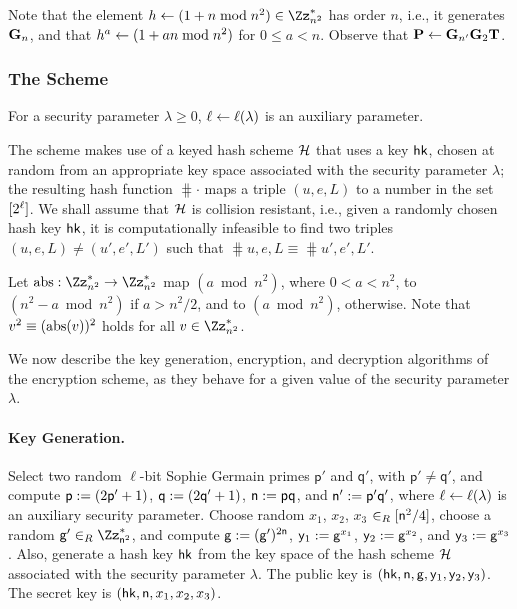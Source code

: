 Note that the element $h \asn (1 + n \bmod n^2) \in \Z{n^2}^*$ has 
order $n$, 
i.e.,
it generates $\mathbf{G}_n$,
and that $h^a \gets (1 + a n \bmod n^2)$ for $0 \le a < n$.
Observe that $\mathbf{P} \gets \mathbf{G}_{n'} \mathbf{G}_2 \mathbf{T}$.

\subsubsection{The Scheme}
For a security parameter $\lambda \ge 0$, $\ell \gets \ell(\lambda)$
is an auxiliary parameter.

The scheme makes use of a keyed hash scheme $\mathcal{H}$ that uses a key 
$\mathsf{hk}$, chosen at random from an appropriate key space associated
with the security parameter $\lambda$;  the resulting hash function
$\hash{\cdot}$ maps a triple $(u, e, L)$ to a number
in the set $[2^{\ell}]$.
We shall assume that $\mathcal{H}$ is collision resistant, i.e.,
given a randomly chosen hash key $\mathsf{hk}$, it is
computationally infeasible to find  two triples $(u,e,L) \ne (u', e', L')$
such that $\hash{u,e,L} \equiv \hash{u',e',L'}$.

Let $\abs : \Zs{n^2} \rightarrow \Zs{n^2}$ map $(a \bmod n^2)$,
where $0 < a < n^2$, to $(n^2 - a \bmod n^2)$ if $a > n^2/2$,
and to $(a \bmod n^2)$, otherwise.
Note that $v^2 \equiv (\mathop{\mathrm{abs}}(v))^2$ holds for all $v \in \Zs{n^2}$.

We now describe the key generation, encryption, and decryption
algorithms of the encryption scheme, as they behave for
a given value of the security parameter $\lambda$.

\paragraph{Key Generation.}
  Select two random $\ell$-bit Sophie Germain
  primes $\mathsf{p}'$ and $\mathsf{q}'$, with $\mathsf{p}' \ne \mathsf{q}'$, and compute $\mathsf{p}:= (2\mathsf{p}'+1)$,
  $\mathsf{q}:= (2\mathsf{q}'+1)$, $\mathsf{n}:= \mathsf{p}\mathsf{q}$, and $\mathsf{n}':= \mathsf{p}'\mathsf{q}'$, where
  $\ell \gets \ell(\lambda)$ is an auxiliary security parameter.
  Choose random $x_1$, $x_2$, $x_3$ $\in_R [\mathsf{n}^2/4]$,
  choose a random $\mathsf{g}' \inR \Zs{\mathsf{n}^2}$, and compute $\mathsf{g} := (\mathsf{g}')^{2\mathsf{n}}$,
  $\mathsf{y}_1:= \mathsf{g}^{x_1}$, $\mathsf{y}_2:= \mathsf{g}^{x_2}$, and $\mathsf{y}_3 := \mathsf{g}^{x_3}$.
  Also, generate a hash key $\mathsf{hk}$ from the key space of the hash scheme
  $\mathcal{H}$ associated with the security parameter $\lambda$.
The public key is $(\mathsf{hk}, \mathsf{n}, \mathsf{g}, \mathsf{y}_1, \mathsf{y}_2, \mathsf{y}_3)$.
The secret key is $(\mathsf{hk}, \mathsf{n}, x_1, x_2, x_3)$.

